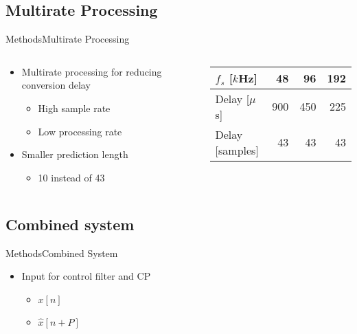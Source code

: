 \subsection{Multirate Processing}
\begin{frame}{Methods}{Multirate Processing}	
\begin{columns}
	\begin{column}{0.5\textwidth}
		\begin{itemize}
			\item Multirate processing for reducing conversion delay
			\begin{itemize}
				\item High sample rate
				\item Low processing rate
			\end{itemize}
			\item Smaller prediction length
			\begin{itemize}
				\item 10 instead of 43
			\end{itemize}
		\end{itemize}
	\end{column}
	\begin{column}{0.5\textwidth} 
		\begin{table}[H]
			\centering
			\begin{tabular}{|l|r|r|r|}
				\hline
				$f_s$ {[}$k$Hz{]} & 48 & 96 & 192 \\ \hline
				Delay {[}$\mu$s{]} & 900 & 450 & 225 \\ \hline
				Delay {[}samples{]} & 43 & 43 & 43 \\ \hline
			\end{tabular}
		\end{table}
	\end{column}
\end{columns}
\end{frame}




\subsection{Combined system}
\begin{frame}{Methods}{Combined System}	
		\begin{itemize}
			\item Input for control filter and CP
			\begin{itemize}
			\item $x[n]$
			\item $\hat{x}[n+P]$
			\end{itemize}
		\end{itemize}
\begin{center}
	\resizebox{0.9\columnwidth}{!}{		
			}
\end{center}

\end{frame}






